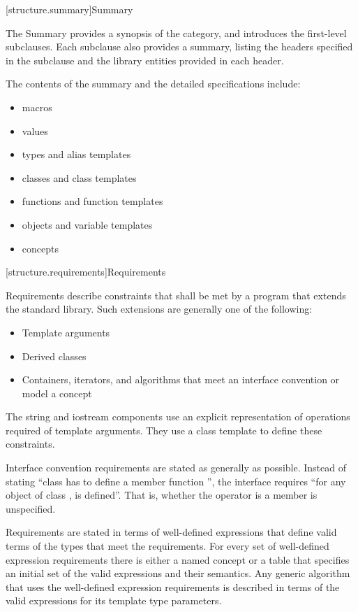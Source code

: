 [structure.summary]{Summary}

\pnum
The Summary provides a synopsis of the category, and introduces the first-level subclauses.
Each subclause also provides a summary, listing the headers specified in the
subclause and the library entities provided in each header.

\pnum
The contents of the summary and the detailed specifications include:

\begin{itemize}
\item macros
\item values
\item types and alias templates
\item classes and class templates
\item functions and function templates
\item objects and variable templates
\item concepts
\end{itemize}

[structure.requirements]{Requirements}

\pnum
{}%
Requirements describe constraints that shall be met by a \Cpp{} program that extends the standard library.
Such extensions are generally one of the following:

\begin{itemize}
\item Template arguments
\item Derived classes
\item Containers, iterators, and algorithms that meet an interface convention or
  model a concept
\end{itemize}

\pnum
The string and iostream components use an explicit representation of operations
required of template arguments. They use a class template  to
define these constraints.

\pnum
Interface convention requirements are stated as generally as possible. Instead
of stating ``class  has to define a member function '', the
interface requires ``for any object  of class ,  is
defined''. That is, whether the operator is a member is unspecified.

\pnum
Requirements are stated in terms of well-defined expressions that define valid terms of
the types that meet the requirements. For every set of well-defined expression
requirements there is either a named concept or a table that specifies an initial set of the valid expressions and
their semantics. Any generic algorithm that uses the
well-defined expression requirements is described in terms of the valid expressions for
its template type parameters.


